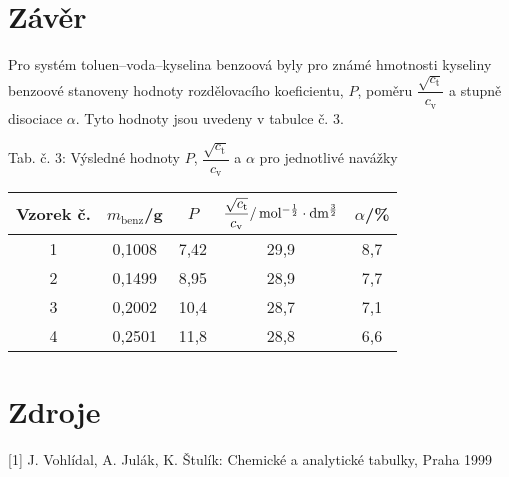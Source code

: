 \documentclass[12pt,a4paper]{article}
\def\ri#1{\mathrm{#1}}
\def\jd#1{\ifmmode\,\mathrm{#1}\else\,\textrm{#1}\fi}
\begin{document}
\section*{Závěr}
Pro systém toluen--voda--kyselina benzoová byly pro známé hmotnosti kyseliny benzoové stanoveny hodnoty rozdělovacího koeficientu, $P$, poměru $\dfrac{\sqrt{c_\ri{t}}}{c_\ri{v}}$ a stupně disociace $\alpha$. Tyto hodnoty jsou uvedeny v tabulce č. 3.
\begin{center}
	\noindent Tab. č. 3: Výsledné hodnoty $P$, $\dfrac{\sqrt{c_\ri{t}}}{c_\ri{v}}$ a $\alpha$ pro jednotlivé navážky\\
	\begin{tabular}{c|c|c|c|c}
		Vzorek č. & $m_\ri{benz}$/g & $P$ & $\dfrac{\sqrt{c_\ri{t}}}{c_\ri{v}}/\jd{mol^{-\frac{1}{2}}\cdot dm^{\frac{3}{2}}}$ & $\alpha$/\%\\
		\hline
		1 & 0,1008 & 7,42 & 29,9 & 8,7\\
		2 & 0,1499 & 8,95 & 28,9 & 7,7\\
		3 & 0,2002 & 10,4 & 28,7 & 7,1\\
		4 & 0,2501 & 11,8 & 28,8 & 6,6\\
	\end{tabular}
\end{center}
\section*{Zdroje}
[1] J. Vohlídal, A. Julák, K. Štulík: Chemické a analytické tabulky, Praha 1999
\end{document}
